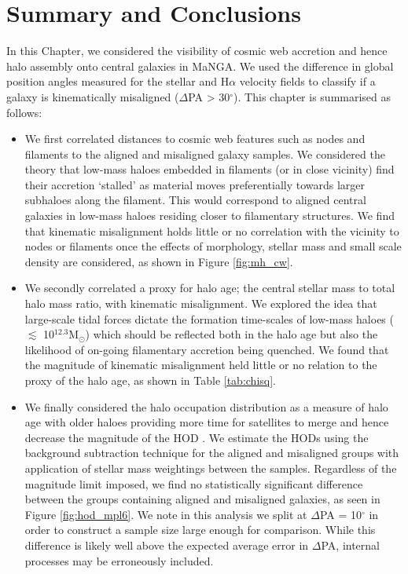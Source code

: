 \section{Summary and Conclusions} \label{sec:ham_conclusions}
In this Chapter, we considered the visibility of cosmic web accretion and hence halo assembly onto central galaxies in MaNGA. We used the difference in global position angles measured for the stellar and H$\alpha$ velocity fields to classify if a galaxy is kinematically misaligned ($\Delta$PA > 30$^{\circ}$). This chapter is summarised as follows:
\begin{itemize}
\item We first correlated distances to cosmic web features such as nodes and filaments to the aligned and misaligned galaxy samples. We considered the theory that low-mass haloes embedded in filaments (or in close vicinity) find their accretion `stalled' as material moves preferentially towards larger subhaloes along the filament. This would correspond to aligned central galaxies in low-mass haloes residing closer to filamentary structures. We find that kinematic misalignment holds little or no correlation with the vicinity to nodes or filaments once the effects of morphology, stellar mass and small scale density are considered, as shown in Figure \ref{fig:mh_cw}. 
\item We secondly correlated a proxy for halo age; the central stellar mass to total halo mass ratio, with kinematic misalignment. We explored the idea that large-scale tidal forces dictate the formation time-scales of low-mass haloes ($\lesssim$ 10$^{12.3} \mathrm{M_{\odot}}$) which should be reflected both in the halo age but also the likelihood of on-going filamentary accretion being quenched. We found that the magnitude of kinematic misalignment held little or no relation to the proxy of the halo age, as shown in Table \ref{tab:chisq}. 
\item We finally considered the halo occupation distribution as a measure of halo age with older haloes providing more time for satellites to merge and hence decrease the magnitude of the HOD \citep[e.g.][]{zehavi2018}. We estimate the HODs using the background subtraction technique for the aligned and misaligned groups with application of stellar mass weightings between the samples. Regardless of the magnitude limit imposed, we find no statistically significant difference between the groups containing aligned and misaligned galaxies, as seen in Figure \ref{fig:hod_mpl6}. We note in this analysis we split at $\Delta$PA = 10$^{\circ}$ in order to construct a sample size large enough for comparison. While this difference is likely well above the expected average error in $\Delta$PA, internal processes may be erroneously included.
\end{itemize}

